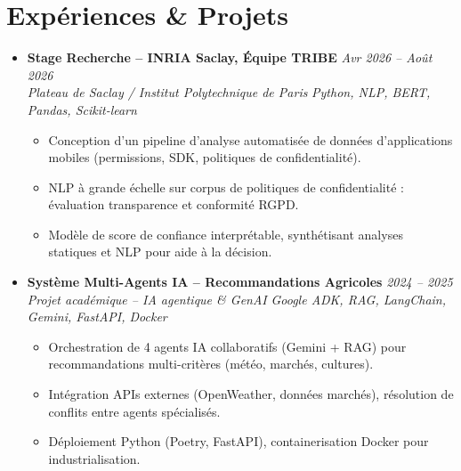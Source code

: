 \documentclass[a4paper,11pt]{article}
\begin{document}
\section{Expériences \& Projets}
\begin{itemize}[leftmargin=*, label={-}]

\item \textbf{Stage Recherche -- INRIA Saclay, Équipe TRIBE} \hfill \textit{Avr 2026 -- Août 2026} \\
\textit{Plateau de Saclay / Institut Polytechnique de Paris} \hfill \textit{Python, NLP, BERT, Pandas, Scikit-learn}
\vspace{-2pt}
    \begin{itemize}[leftmargin=0.4cm, nosep, label=\tiny$\bullet$]
        \item \small{Conception d'un pipeline d'analyse automatisée de données d'applications mobiles (permissions, SDK, politiques de confidentialité).}
        \item \small{NLP à grande échelle sur corpus de politiques de confidentialité : évaluation transparence et conformité RGPD.}
        \item \small{Modèle de score de confiance interprétable, synthétisant analyses statiques et NLP pour aide à la décision.}
    \end{itemize}
\vspace{3pt}

\item \textbf{Système Multi-Agents IA -- Recommandations Agricoles} \hfill \textit{2024 -- 2025} \\
\textit{Projet académique -- IA agentique \& GenAI} \hfill \textit{Google ADK, RAG, LangChain, Gemini, FastAPI, Docker}
\vspace{-2pt}
    \begin{itemize}[leftmargin=0.4cm, nosep, label=\tiny$\bullet$]
        \item \small{Orchestration de 4 agents IA collaboratifs (Gemini + RAG) pour recommandations multi-critères (météo, marchés, cultures).}
        \item \small{Intégration APIs externes (OpenWeather, données marchés), résolution de conflits entre agents spécialisés.}
        \item \small{Déploiement Python (Poetry, FastAPI), containerisation Docker pour industrialisation.}
    \end{itemize}
\vspace{3pt}


\end{itemize}
\end{document}
